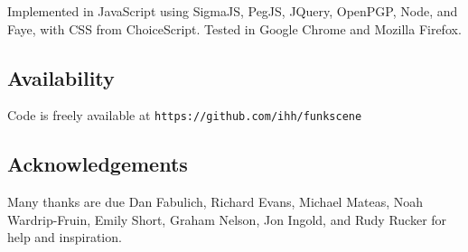 \documentclass{acm_proc_article-sp}
\begin{document}
Implemented in JavaScript
using SigmaJS, PegJS, JQuery, OpenPGP, Node, and Faye,
with CSS from ChoiceScript.
Tested in Google Chrome and Mozilla Firefox.



\subsection{Availability}

Code is freely available at
{\tt https://github.com/ihh/funkscene}


\subsection{Acknowledgements}

Many thanks are due Dan Fabulich, Richard Evans, Michael Mateas, Noah Wardrip-Fruin,
Emily Short, Graham Nelson, Jon Ingold,
and Rudy Rucker for help and inspiration.




\balancecolumns
\end{document}
